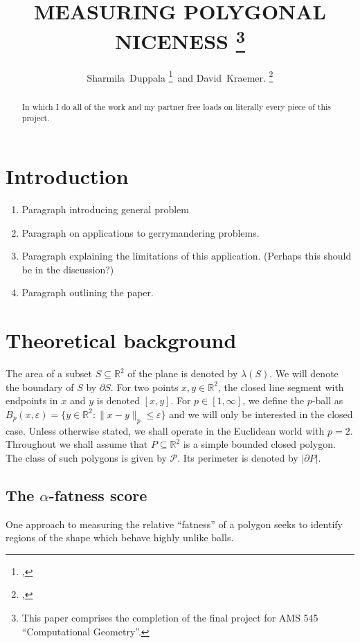 \documentclass[draft]{jocg}
\title{%
  \MakeUppercase{Measuring polygonal niceness}%
  \thanks{%
    This paper comprises the completion of the final project for AMS 545
    ``Computational Geometry''.
  }
}
\author{%
  Sharmila~Duppala%
  \thanks{%
    \affil{Department of Computer Science}, 
    \email{sduppala@cs.stonybrook.edu}%
  }\, and
  David~Kraemer.%
  \thanks{%
    \affil{Department of Applied Mathematics},
    \email{david.kraemer@stonybrook.edu}%
  }
}
\newcommand{\RR}{\mathbb{R}}
\newcommand{\PP}{\mathcal{P}}
\newcommand{\set}[1]{\{#1\}}
\newcommand{\norm}[1]{\|#1\|}
\newcommand{\abs}[1]{|#1|}
\theoremstyle{definition}
\theoremstyle{remark}
\begin{document}
\maketitle

\begin{abstract}
  In which I do all of the work and my partner free loads on literally every
  piece of this project.
\end{abstract}

\tableofcontents

\section{Introduction}

\begin{enumerate}
  \item Paragraph introducing general problem
  \item Paragraph on applications to gerrymandering problems.
  \item Paragraph explaining the limitations of this application. (Perhaps this
    should be in the discussion?)
  \item Paragraph outlining the paper.
\end{enumerate}

\section{Theoretical background}

The area of a subset $S \subseteq \RR^2$ of the plane is denoted by
$\lambda(S)$. We will denote the boundary of $S$ by $\partial S$. For two points
$x,y \in \RR^2$, the closed line segment with endpoints in $x$ and $y$ is
denoted $[x,y]$. For $p \in [1, \infty]$, we define the $p$-ball as $B_{p}(x,
\varepsilon) = \set{y \in \RR^2 : \norm{x-y}_p \leq \varepsilon}$ and we will
only be interested in the closed case. Unless otherwise stated, we shall operate
in the Euclidean world with $p = 2$. Throughout we shall assume that $P
\subseteq \RR^2$ is a simple bounded closed polygon. The class of such polygons
is given by $\PP$. Its perimeter is denoted by $\abs{\partial P}$.

\subsection{The $\alpha$-fatness score}

One approach to measuring the relative ``fatness'' of a polygon seeks to
identify regions of the shape which behave highly unlike balls.
\end{document}
